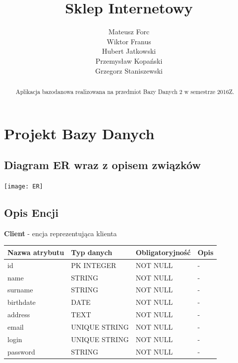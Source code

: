 \documentclass[10pt,a4paper]{article}
\author{
  \small Mateusz Forc\\
  \small Wiktor Franus\\
  \small Hubert Jatkowski\\
  \small Przemysław Kopański\\
  \small Grzegorz Staniszewski\\
}
\title{Sklep Internetowy}
\begin{document}
  \maketitle
  \begin{abstract}
    \center 
    Aplikacja bazodanowa realizowana na przedmiot \newline 
           Bazy Danych 2 w semestrze 2016Z.
  \end{abstract}
  \tableofcontents
  \newpage
  \section{Projekt Bazy Danych}
  
    \subsection{Diagram ER wraz z opisem związków}
      \begin{center}
        \texttt{[image: ER]}
      \end{center}
          \newpage 
    \subsection{Opis Encji}
     \textbf{Client} - encja reprezentująca klienta
      \begin{center}
        \begin{tabular}{| m{3cm} | m{3cm} | m{3cm} | m{3cm} |}
          \hline
          Nazwa atrybutu & Typ danych & Obligatoryjność & Opis\\ \hline
		  id        & PK INTEGER    & NOT NULL 		    & -\\ \hline
		  name      & STRING        & NOT NULL 			& -\\ \hline
		  surname   & STRING        & NOT NULL 			& -\\ \hline
		  birthdate & DATE          & NOT NULL 			& -\\ \hline
		  address   & TEXT          & NOT NULL 			& -\\ \hline
		  email     & UNIQUE STRING & NOT NULL 			& -\\ \hline
		  login     & UNIQUE STRING & NOT NULL 			& -\\ \hline
		  password  & STRING        & NOT NULL 			& -\\ \hline
		\end{tabular}
	  \end{center}
\end{document}
